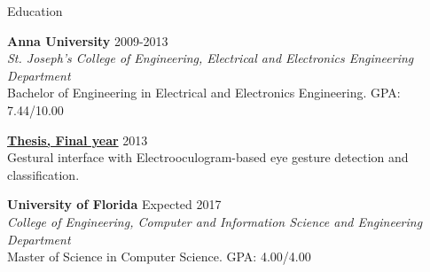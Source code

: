 \documentclass{resume} %
\begin{document}

\begin{rSection}{Education}
\vspace{2mm}

{\bf Anna University} \hfill {2009-2013} \\
\textit{St. Joseph's College of Engineering, Electrical and Electronics Engineering Department}\\
Bachelor of Engineering in Electrical and Electronics Engineering. GPA: 7.44/10.00

{\bf {\href{http://onloop.net/hairyplotter/}{Thesis, Final year}}} \hfill {2013} \\
Gestural interface with Electrooculogram-based eye gesture detection and classification.

{\bf University of Florida} \hfill {Expected 2017} \\
\textit{College of Engineering, Computer and Information Science and Engineering Department} \\
Master of Science in Computer Science. GPA: 4.00/4.00

\end{rSection}

\end{document}
